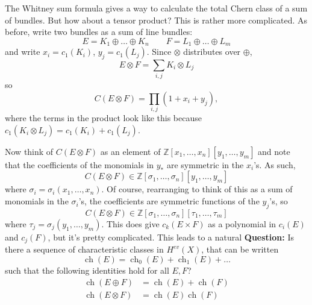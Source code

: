 \documentclass[a4paper,10pt]{article}
\theoremstyle{plain}%
\theoremstyle{definition}
\theoremstyle{remark}
\newcommand{\ZZ}{\mathbb{Z}}
\DeclareMathOperator{\ch}{ch}
\begin{document}
The Whitney sum formula gives a way to calculate the total Chern class
of a sum of bundles. But how about a tensor product? This is rather
more complicated. As before, write two bundles as a sum of line
bundles:
\begin{equation*}
  E = K_1 \oplus \dots \oplus K_n \qquad
  F = L_1 \oplus \dots \oplus L_m
\end{equation*}
and write $x_i = c_1(K_i)$, $y_j = c_1(L_j)$. Since $\otimes$
distributes over $\oplus$,
\begin{equation*}
  E \otimes F = \sum_{i,j} K_i \otimes L_j
\end{equation*}
so
\begin{equation*}
  C(E\otimes F) = \prod_{i,j}(1+x_i+y_j),
\end{equation*}
where the terms in the product look like this because $c_1(K_i\otimes
L_j) = c_1(K_i)+c_1(L_j)$.

Now think of $C(E\otimes F)$ as an element of
$\ZZ[x_1,\dots,x_n][y_1,\dots,y_m]$ and note that the coefficients
of the monomials in $y_*$ are symmetric in the $x_i$'s. As such,
\begin{equation*}
  C(E\otimes F) \in \ZZ[\sigma_1,\dots,\sigma_n][y_1,\dots,y_m]
\end{equation*}
where $\sigma_i = \sigma_i(x_1,\dots,x_n)$. Of course, rearranging to
think of this as a sum of monomials in the $\sigma_i$'s, the
coefficients are symmetric functions of the $y_j$'s, so
\begin{equation*}
  C(E\otimes F) \in \ZZ[\sigma_1,\dots,\sigma_n][\tau_1,\dots,\tau_m]
\end{equation*}
where $\tau_j = \sigma_j(y_1,\dots,y_m)$. This does give $c_k(E\times
F)$ as a polynomial in $c_i(E)$ and $c_j(F)$, but it's pretty
complicated. This leads to a natural \textbf{Question:} Is there a
sequence of characteristic classes in $H^{ev}(X)$, that can be written
\begin{equation*}
  \ch(E) = \ch_0(E) + \ch_1(E) + \dots
\end{equation*}
such that the following identities hold for all $E, F$?
\begin{align*}
  \ch(E\oplus F) &= \ch(E) + \ch(F)\\
  \ch(E\otimes F) &= \ch(E)\ch(F)
\end{align*}
\end{document}
